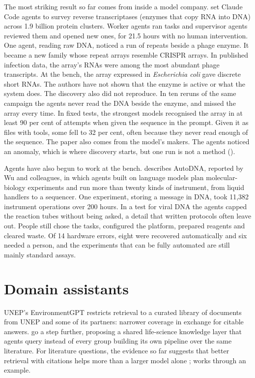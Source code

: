 The most striking result so far comes from inside a model company.
\textcite{yoon2026art} set Claude Code agents to survey reverse transcriptases
(enzymes that copy RNA into DNA) across 1.9 billion protein clusters. Worker
agents ran tasks and supervisor agents reviewed them and opened new ones, for
21.5 hours with no human intervention. One agent, reading raw DNA, noticed a
run of repeats beside a phage enzyme. It became a new family whose repeat
arrays resemble CRISPR arrays. In published infection data, the array's RNAs
were among the most abundant phage transcripts. At the bench, the array
expressed in \emph{Escherichia coli} gave discrete short RNAs. The authors have
not shown that the enzyme is active or what the system does. The
discovery also did not reproduce. In ten reruns of the same campaign the agents
never read the DNA beside the enzyme, and missed the array every time. In
fixed tests, the strongest models recognised the array in at least 90 per cent
of attempts when given the sequence in the prompt. Given it as files with
tools, some fell to 32 per cent, often because they never read enough of the
sequence. The paper also comes from the model's makers. The agents noticed an
anomaly, which is where discovery starts, but one run is not a method
().

Agents have also begun to work at the bench. \textcite{zou2026wetlab}
describes AutoDNA, reported by Wu and colleagues, in which agents built on
language models plan molecular-biology experiments and run more than twenty
kinds of instrument, from liquid handlers to a sequencer. One experiment,
storing a message in DNA, took 11,382 instrument operations over 200 hours. In
a test for viral DNA the agents capped the reaction tubes without being asked,
a detail that written protocols often leave out. People still chose the tasks,
configured the platform, prepared reagents and cleared waste. Of 14 hardware
errors, eight were recovered automatically and six needed a person, and the
experiments that can be fully automated are still mainly standard assays.

\section{Domain assistants}

UNEP's EnvironmentGPT \parencite{unep2026environmentgpt} restricts retrieval to
a curated library of documents from UNEP and some of its partners: narrower
coverage in exchange for citable answers. \textcite{sigillo2026embllibrarian} go a step further, proposing
a shared life-science knowledge layer that agents query instead of every group
building its own pipeline over the same literature. For literature questions,
the evidence so far suggests that better retrieval with citations helps more
than a larger model alone \parencite{sigillo2026embllibrarian,asai2026openscholar};
 works through an example.

